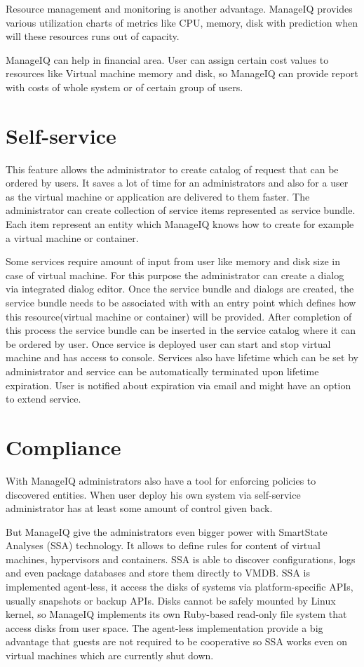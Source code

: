 Resource management and monitoring is another advantage. ManageIQ provides various utilization charts of metrics like CPU, memory, disk with prediction when will these resources runs out of capacity.

ManageIQ can help in financial area. User can assign certain cost values to resources like Virtual machine memory and disk, so ManageIQ can provide report with costs of whole system or of certain group of users.

\section{Self-service}
This feature allows the administrator to create catalog of request that can be ordered by users. It saves a lot of time for an administrators and also for a user as the virtual machine or application are delivered to them faster. The administrator can create collection of service items represented as service bundle. Each item represent an entity which ManageIQ knows how to create for example a virtual machine or container. 

Some services require amount of input from user like memory and disk size in case of virtual machine. For this purpose the administrator can create a dialog via integrated dialog editor. Once the service bundle and dialogs are created, the service bundle needs to be associated with with an entry point which defines how this resource(virtual machine or container) will be provided. After completion of this process the service bundle can be inserted in the service catalog where it can be ordered by user. Once service is deployed user can start and stop virtual machine and has access to console. Services also have lifetime which can be set by administrator and service can be automatically terminated upon lifetime expiration. User is notified about expiration via email and might have an option to extend service.

\section{Compliance}
With ManageIQ administrators also have a tool for enforcing policies to discovered entities. When user deploy his own system via self-service administrator has at least some amount of control given back.

But ManageIQ give the administrators even bigger power with SmartState Analyses (SSA) technology. It allows to define rules for content of virtual machines, hypervisors and containers. SSA is able to discover configurations, logs and even package databases and store them directly to VMDB. SSA is implemented agent-less, it access the disks of systems via platform-specific APIs, usually snapshots or backup APIs. Disks cannot be safely mounted by Linux kernel, so ManageIQ implements its own Ruby-based read-only file system that access disks from user space. The agent-less implementation provide a big advantage that guests are not required to be cooperative so SSA works even on virtual machines which are currently shut down.


